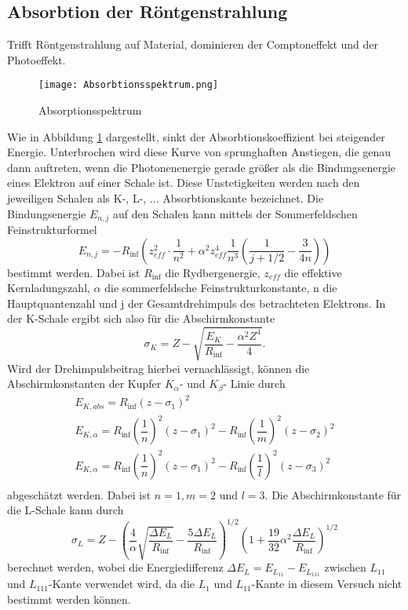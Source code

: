 \subsection{Absorbtion der Röntgenstrahlung}
    Trifft Röntgenstrahlung auf Material, dominieren der Comptoneffekt und der Photoeffekt.
    \begin{figure}
        \centering
        \texttt{[image: Absorbtionsspektrum.png]}
        \caption{Absorptionsspektrum}
        \label{fig:rechtschreifehler}
      \end{figure}
    Wie in Abbildung \ref{fig:rechtschreifehler} dargestellt, sinkt der Absorbtionskoeffizient bei steigender Energie.
    Unterbrochen wird diese Kurve von sprunghaften Anstiegen, die genau dann auftreten, wenn 
    die Photonenenergie gerade größer als die Bindungsenergie eines Elektron auf einer Schale ist.
    Diese Unstetigkeiten werden nach den jeweiligen Schalen als K-, L-, ... Absorbtionskante
    bezeichnet. Die Bindungsenergie $E_{n,j}$ auf den Schalen kann mittels der 
    Sommerfeldschen Feinstrukturformel
    \begin{equation}
        E_{n, j}=-R_{\inf}(z_{eff}^2 \cdot \dfrac{1}{n^2} + \alpha^2z_{eff}^4 \dfrac{1}{n^3}
        (\dfrac{1}{j+1/2}-\dfrac{3}{4n}))
    \end{equation}
    bestimmt werden. Dabei ist $R_{\inf}$ die Rydbergenergie, $z_{eff}$ die effektive
    Kernladungszahl, $\alpha$ die sommerfeldsche Feinstrukturkonstante, n die Hauptquantenzahl
    und j der Gesamtdrehimpuls des betrachteten Elektrons. In der K-Schale ergibt sich also
    für die Abschirmkonstante 
    \begin{equation}
        \sigma_K = Z - \sqrt{\dfrac{E_K}{R_{\inf}}-\dfrac{\alpha^2 Z^4}{4}}.
        \label{eqn:sigma}
    \end{equation}
    Wird der Drehimpulsbeitrag hierbei vernachlässigt, können die Abschirmkonstanten der Kupfer
    $K_{\alpha}$- und $K_{\beta}$- Linie durch 
    \begin{align}
        E_{K, abs}=R_{\inf} (z-\sigma_1)^2\\
        \label{eqn:nikolaaaa}
        E_{K, \alpha}=R_{\inf} (\dfrac{1}{n})^2 (z-\sigma_1)^2 - R_{\inf} (\dfrac{1}{m})^2 (z-\sigma_2)^2 \\
        \label{eqn:nikolaaaaa}
        E_{K, \alpha}=R_{\inf} (\dfrac{1}{n})^2 (z-\sigma_1)^2 - R_{\inf} (\dfrac{1}{l})^2 (z-\sigma_3)^2 \\
        \label{eqn:nikolaaaaaa}
    \end{align}
    abgeschätzt werden. Dabei ist $n=1, m=2$ und $l=3$.
    Die Abschirmkonstante für die L-Schale kann durch 
    \begin{equation}
        \sigma_L=Z-(\dfrac{4}{\alpha} \sqrt{\dfrac{\Delta E_L}{R_{\inf}}}-\dfrac{5 \Delta E_L}
        {R_{\inf}})^{1/2} (1+\dfrac{19}{32}\alpha^2 \dfrac{\Delta E_L}{R_{\inf}})^{1/2}
    \end{equation}
    berechnet werden, wobei die Energiedifferenz $\Delta E_L = E_{L_{11}} - E_{L_{111}}$ zwischen 
    $L_{11}$ und $L_{111}$-Kante verwendet wird, da die $L_1$ und $L_{11}$-Kante in diesem
    Versuch nicht bestimmt werden können.

